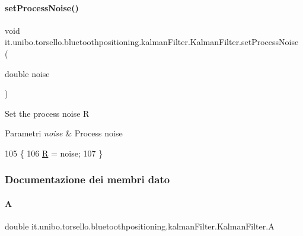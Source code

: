 \paragraph{\texorpdfstring{set\+Process\+Noise()}{setProcessNoise()}}
{\footnotesize\ttfamily void it.\+unibo.\+torsello.\+bluetoothpositioning.\+kalman\+Filter.\+Kalman\+Filter.\+set\+Process\+Noise (\begin{DoxyParamCaption}\item[{double}]{noise }\end{DoxyParamCaption})}

Set the process noise R


\begin{DoxyParams}{Parametri}
{\em noise} & Process noise \\
\hline
\end{DoxyParams}

\begin{DoxyCode}
105                                               \{
106         \hyperlink{classit_1_1unibo_1_1torsello_1_1bluetoothpositioning_1_1kalmanFilter_1_1KalmanFilter_ad9b73500bbbee6969b5cfbe1a6e7a5ab_ad9b73500bbbee6969b5cfbe1a6e7a5ab}{R} = noise;
107     \}
\end{DoxyCode}


\subsubsection{Documentazione dei membri dato}
\hypertarget{classit_1_1unibo_1_1torsello_1_1bluetoothpositioning_1_1kalmanFilter_1_1KalmanFilter_a5222a1da9d5ef7f961a870402a245c06_a5222a1da9d5ef7f961a870402a245c06}{}\label{classit_1_1unibo_1_1torsello_1_1bluetoothpositioning_1_1kalmanFilter_1_1KalmanFilter_a5222a1da9d5ef7f961a870402a245c06_a5222a1da9d5ef7f961a870402a245c06} 
\paragraph{\texorpdfstring{A}{A}}
{\footnotesize\ttfamily double it.\+unibo.\+torsello.\+bluetoothpositioning.\+kalman\+Filter.\+Kalman\+Filter.\+A\hspace{0.3cm}{\ttfamily [private]}}

